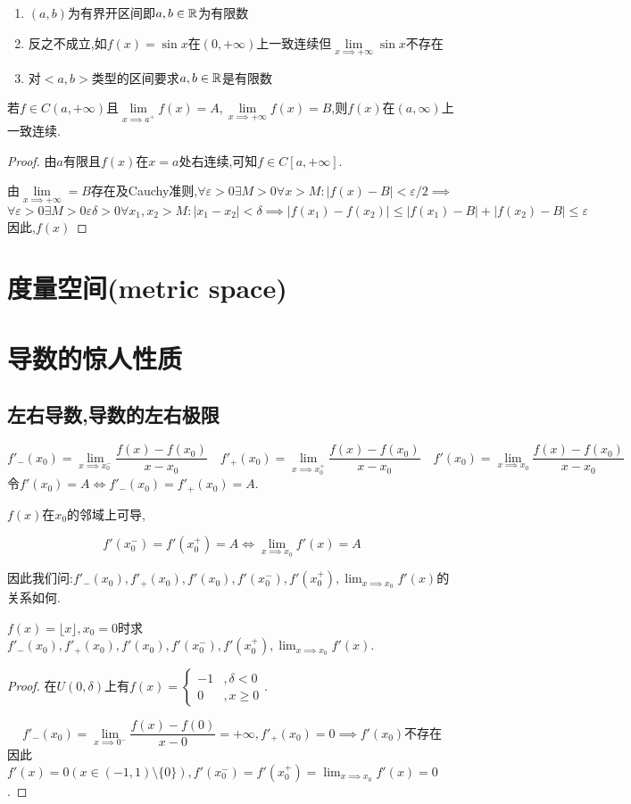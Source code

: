 \documentclass[UTF8]{book}
\begin{document}
    \begin{enumerate}
        \item $(a,b)$为有界开区间即$a,b\in \mathbb{R}$为有限数
        \item 反之不成立,如$f(x)=\sin x$在$(0,+\infty)$上一致连续但$\lim\limits_{x\implies +\infty}\sin x$不存在
        \item 对$<a,b>$类型的区间要求$a,b\in \mathbb{R}$是有限数
    \end{enumerate}
    \begin{theorem}
        若$f\in C(a,+\infty)$且$\lim\limits_{x\implies a^+}f(x)=A,\lim\limits_{x\implies +\infty}f(x)=B$,则$f(x)$在$(a,\infty)$上一致连续.
    \end{theorem}\begin{proof}
        由$a$有限且$f(x)$在$x=a$处右连续,可知$f\in C[a,+\infty]$.

        由$\lim\limits_{x\implies +\infty}=B$存在及Cauchy准则,$\forall \varepsilon>0\exists M>0\forall x>M:|f(x)-B|<\varepsilon/2\implies$ \[\forall \varepsilon>0\exists M>0\varepsilon\delta>0 \forall x_1,x_2>M:|x_1-x_2|<\delta\implies |f(x_1)-f(x_2)|\leq|f(x_1)-B|+|f(x_2)-B|\leq \varepsilon\]
        因此,$f(x)$
    \end{proof}
    \chapter{度量空间(metric space)}
    \chapter{导数的惊人性质}
    \section{左右导数,导数的左右极限}
    \[f'_-(x_0)=\lim_{x\implies x_0^-}\frac{f(x)-f(x_0)}{x-x_0}\quad f'_+(x_0)=\lim_{x\implies x_0^+}\frac{f(x)-f(x_0)}{x-x_0}\quad f'(x_0)=\lim_{x\implies x_0}\frac{f(x)-f(x_0)}{x-x_0}\]
    令$f'(x_0)=A\iff f'_-(x_0)=f'_+(x_0)=A$.

    $f(x)$在$x_0$的邻域上可导,
    \begin{proposition}
        \[f'(x_0^-)=f'(x_0^+)=A\iff \lim_{x\implies x_0}f'(x)=A\]
    \end{proposition}
    因此我们问:$f'_-(x_0),f'_+(x_0),f'(x_0),f'(x_0^-),f'(x_0^+),\lim_{x\implies x_0}f'(x)$的关系如何.
    \begin{example}
        $f(x)=\lfloor x\rfloor,x_0=0$时求$f'_-(x_0),f'_+(x_0),f'(x_0),f'(x_0^-),f'(x_0^+),\lim_{x\implies x_0}f'(x)$.
        \begin{proof}
            在$U(0,\delta)$上有$f(x)=\begin{cases}
                -1&,\delta<0\\ 0&,x\geq 0
            \end{cases}$.

            \[f'_-(x_0)=\lim_{x\implies 0^-}\frac{f(x)-f(0)}{x-0}=+\infty ,f'_+(x_0)=0\implies f'(x_0)\text{不存在}\]
            因此$f'(x)=0(x\in (-1,1)\setminus \{0\}),f'(x_0^-)=f'(x_0^+)=\lim_{x\implies x_0}f'(x)=0$.
        \end{proof}
    \end{example}
\end{document}
